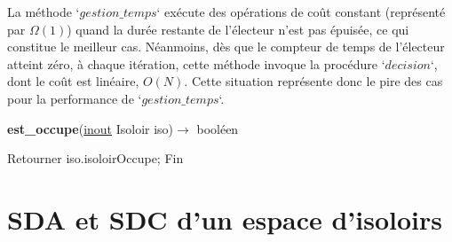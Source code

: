 \documentclass[12pt]{article} %
\begin{document}
La méthode `$gestion\_temps$` exécute des opérations de coût constant (représenté par $\Omega(1)$) quand la durée restante de l'électeur n'est pas épuisée, ce qui constitue le meilleur cas. Néanmoins, dès que le compteur de temps de l'électeur atteint zéro, à chaque itération, cette méthode invoque la procédure `$decision$`, dont le coût est linéaire, $O(N)$. Cette situation représente donc le pire des cas pour la performance de `$gestion\_temps$`.
\begin{algorithm}
	\caption{\textbf{est\_occupe}(\underline{inout} Isoloir iso)$\rightarrow$ booléen}
	\begin{algorithmic}[1]
		\Start
		\State Retourner iso.isoloirOccupe; 
		\State Fin
	\end{algorithmic}
\end{algorithm}

\newpage

\section*{SDA et SDC d'un espace d'isoloirs}
\end{document}
